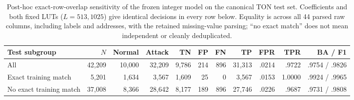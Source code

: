 \begin{table}[t]
\caption{Post-hoc exact-row-overlap sensitivity of the frozen integer model on the canonical TON test set. Coefficients and both fixed LUTs ($L=513,1025$) give identical decisions in every row below. Equality is across all 44 parsed raw columns, including labels and addresses, with the retained missing-value parsing; ``no exact match'' does not mean independent or cleanly deduplicated.}
\label{tab:duplicate-sensitivity}
\centering\footnotesize\setlength{\tabcolsep}{4pt}
\begin{tabular}{lrrrrrrrrrr}
\toprule
Test subgroup & $N$ & Normal & Attack & TN & FP & FN & TP & FPR & TPR & BA / F1\\
\midrule
All & 42,209 & 10,000 & 32,209 & 9,786 & 214 & 896 & 31,313 & .0214 & .9722 & .9754 / .9826\\
Exact training match & 5,201 & 1,634 & 3,567 & 1,609 & 25 & 0 & 3,567 & .0153 & 1.0000 & .9924 / .9965\\
No exact training match & 37,008 & 8,366 & 28,642 & 8,177 & 189 & 896 & 27,746 & .0226 & .9687 & .9731 / .9808\\
\bottomrule
\end{tabular}
\end{table}
